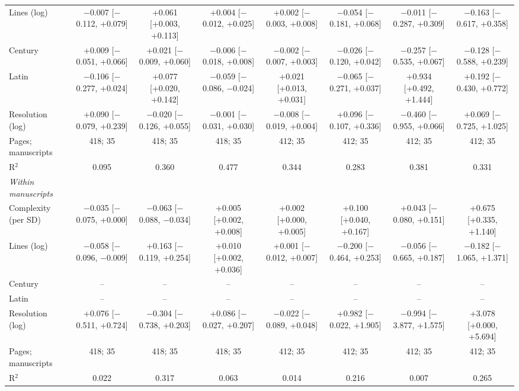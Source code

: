 \begin{table}[htbp]
\begin{tabular}{lccccccc}
    Lines (log) & $-$0.007 [$-$0.112, +0.079] & +0.061 [+0.003, +0.113] & +0.004 [$-$0.012, +0.025] & +0.002 [$-$0.003, +0.008] & $-$0.054 [$-$0.181, +0.068] & $-$0.011 [$-$0.287, +0.309] & $-$0.163 [$-$0.617, +0.358] \\
    Century & +0.009 [$-$0.051, +0.066] & +0.021 [$-$0.009, +0.060] & $-$0.006 [$-$0.018, +0.008] & $-$0.002 [$-$0.007, +0.003] & $-$0.026 [$-$0.120, +0.042] & $-$0.257 [$-$0.535, +0.067] & $-$0.128 [$-$0.588, +0.239] \\
    Latin & $-$0.106 [$-$0.277, +0.024] & +0.077 [+0.020, +0.142] & $-$0.059 [$-$0.086, $-$0.024] & +0.021 [+0.013, +0.031] & $-$0.065 [$-$0.271, +0.037] & +0.934 [+0.492, +1.444] & +0.192 [$-$0.430, +0.772] \\
    Resolution (log) & +0.090 [$-$0.079, +0.239] & $-$0.020 [$-$0.126, +0.055] & $-$0.001 [$-$0.031, +0.030] & $-$0.008 [$-$0.019, +0.004] & +0.096 [$-$0.107, +0.336] & $-$0.460 [$-$0.955, +0.066] & +0.069 [$-$0.725, +1.025] \\
    Pages; manuscripts & 418; 35 & 418; 35 & 418; 35 & 412; 35 & 412; 35 & 412; 35 & 412; 35 \\
    R$^2$ & 0.095 & 0.360 & 0.477 & 0.344 & 0.283 & 0.381 & 0.331 \\
    \midrule
    \textit{Within manuscripts} &  &  &  &  &  &  &  \\
    Complexity (per SD) & $-$0.035 [$-$0.075, +0.000] & $-$0.063 [$-$0.088, $-$0.034] & +0.005 [+0.002, +0.008] & +0.002 [+0.000, +0.005] & +0.100 [+0.040, +0.167] & +0.043 [$-$0.080, +0.151] & +0.675 [+0.335, +1.140] \\
    Lines (log) & $-$0.058 [$-$0.096, $-$0.009] & +0.163 [$-$0.119, +0.254] & +0.010 [+0.002, +0.036] & +0.001 [$-$0.012, +0.007] & $-$0.200 [$-$0.464, +0.253] & $-$0.056 [$-$0.665, +0.187] & $-$0.182 [$-$1.065, +1.371] \\
    Century & -- & -- & -- & -- & -- & -- & -- \\
    Latin & -- & -- & -- & -- & -- & -- & -- \\
    Resolution (log) & +0.076 [$-$0.511, +0.724] & $-$0.304 [$-$0.738, +0.203] & +0.086 [$-$0.027, +0.207] & $-$0.022 [$-$0.089, +0.048] & +0.982 [$-$0.022, +1.905] & $-$0.994 [$-$3.877, +1.575] & +3.078 [+0.000, +5.694] \\
    Pages; manuscripts & 418; 35 & 418; 35 & 418; 35 & 412; 35 & 412; 35 & 412; 35 & 412; 35 \\
    R$^2$ & 0.022 & 0.317 & 0.063 & 0.014 & 0.216 & 0.007 & 0.265 \\
    \bottomrule
  \end{tabular}
\end{table}
